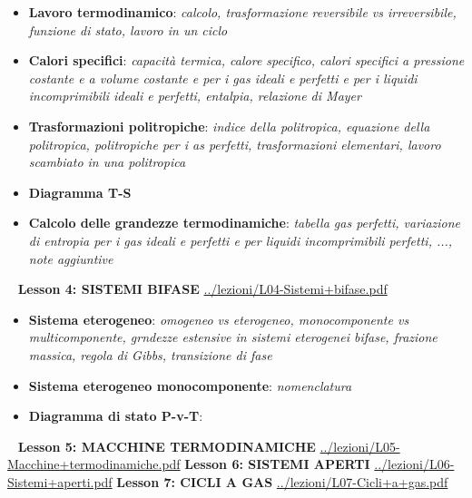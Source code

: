\begin{itemize}
    \item \textbf{Lavoro termodinamico}: \textit{calcolo, trasformazione reversibile vs irreversibile, funzione di stato, lavoro in un ciclo}
    \item \textbf{Calori specifici}: \textit{capacità termica, calore specifico, calori specifici a pressione costante e a volume costante e per i gas ideali e perfetti e per i liquidi incomprimibili ideali e perfetti, entalpia, relazione di Mayer}
    \item \textbf{Trasformazioni politropiche}: \textit{indice della politropica, equazione della politropica, politropiche per i as perfetti, trasformazioni elementari, lavoro scambiato in una politropica}
    \item \textbf{Diagramma T-S}
    \item \textbf{Calcolo delle grandezze termodinamiche}: \textit{tabella gas perfetti, variazione di entropia per i gas ideali e perfetti e per liquidi incomprimibili perfetti, ..., note aggiuntive}
\end{itemize}
\ \newline
\newline
\textbf{Lesson 4: SISTEMI BIFASE}\newline
\url{../lezioni/L04-Sistemi+bifase.pdf}
\begin{itemize}
    \item \textbf{Sistema eterogeneo}: \textit{omogeneo vs eterogeneo, monocomponente vs multicomponente, grndezze estensive in sistemi eterogenei bifase, frazione massica, regola di Gibbs, transizione di fase}
    \item \textbf{Sistema eterogeneo monocomponente}: \textit{nomenclatura}
    \item \textbf{Diagramma di stato P-v-T}: \textit{}
\end{itemize}
\ \newline
\newline
\textbf{Lesson 5: MACCHINE TERMODINAMICHE}\newline
\url{../lezioni/L05-Macchine+termodinamiche.pdf}
\newline
\newline
\textbf{Lesson 6: SISTEMI APERTI}\newline
\url{../lezioni/L06-Sistemi+aperti.pdf}
\newline
\newline
\textbf{Lesson 7: CICLI A GAS}\newline
\url{../lezioni/L07-Cicli+a+gas.pdf}
